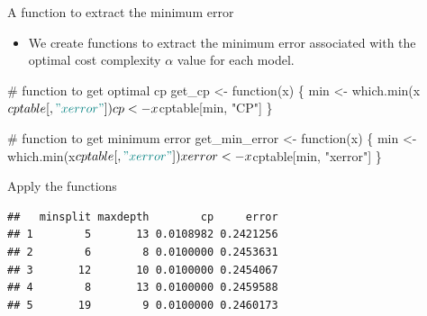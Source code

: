 \documentclass[
  10pt,
  ignorenonframetext,
]{beamer}
\newenvironment{Shaded}{}{}
\newcommand{\CommentTok}[1]{\textcolor[rgb]{0.00,0.50,0.00}{#1}}
\newcommand{\ControlFlowTok}[1]{\textcolor[rgb]{0.00,0.00,1.00}{#1}}
\newcommand{\DataTypeTok}[1]{#1}
\newcommand{\DecValTok}[1]{#1}
\newcommand{\KeywordTok}[1]{\textcolor[rgb]{0.00,0.00,1.00}{#1}}
\newcommand{\NormalTok}[1]{#1}
\newcommand{\OperatorTok}[1]{#1}
\newcommand{\StringTok}[1]{\textcolor[rgb]{0.00,0.50,0.50}{#1}}
\providecommand{\tightlist}{%
  \setlength{\itemsep}{0pt}\setlength{\parskip}{0pt}}
\begin{document}
\begin{frame}[fragile]{A function to extract the minimum error}
\protect\hypertarget{a-function-to-extract-the-minimum-error}{}

\begin{itemize}
\tightlist
\item
  We create functions to extract the minimum error associated with the
  optimal cost complexity \(\alpha\) value for each model.
\end{itemize}

\begin{Shaded}
\begin{Highlighting}[]
\CommentTok{# function to get optimal cp}
\NormalTok{get_cp <-}\StringTok{ }\ControlFlowTok{function}\NormalTok{(x) \{}
\NormalTok{  min    <-}\StringTok{ }\KeywordTok{which.min}\NormalTok{(x}\OperatorTok{$}\NormalTok{cptable[, }\StringTok{"xerror"}\NormalTok{])}
\NormalTok{  cp <-}\StringTok{ }\NormalTok{x}\OperatorTok{$}\NormalTok{cptable[min, }\StringTok{"CP"}\NormalTok{] }
\NormalTok{\}}

\CommentTok{# function to get minimum error}
\NormalTok{get_min_error <-}\StringTok{ }\ControlFlowTok{function}\NormalTok{(x) \{}
\NormalTok{  min    <-}\StringTok{ }\KeywordTok{which.min}\NormalTok{(x}\OperatorTok{$}\NormalTok{cptable[, }\StringTok{"xerror"}\NormalTok{])}
\NormalTok{  xerror <-}\StringTok{ }\NormalTok{x}\OperatorTok{$}\NormalTok{cptable[min, }\StringTok{"xerror"}\NormalTok{] }
\NormalTok{\}}
\end{Highlighting}
\end{Shaded}

\end{frame}

\begin{frame}[fragile]{Apply the functions}
\protect\hypertarget{apply-the-functions}{}

\begin{Shaded}
\end{Shaded}

\begin{verbatim}
##   minsplit maxdepth        cp     error
## 1        5       13 0.0108982 0.2421256
## 2        6        8 0.0100000 0.2453631
## 3       12       10 0.0100000 0.2454067
## 4        8       13 0.0100000 0.2459588
## 5       19        9 0.0100000 0.2460173
\end{verbatim}

\end{frame}
\end{document}
